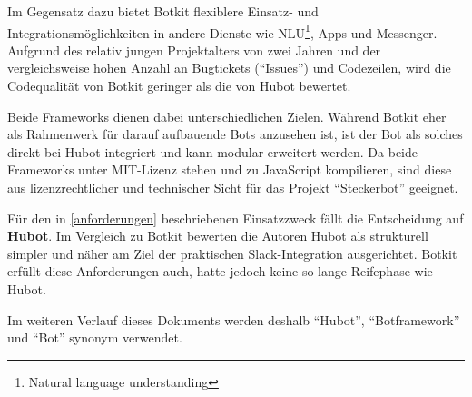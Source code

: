 Im Gegensatz dazu bietet Botkit flexiblere Einsatz- und Integrationsmöglichkeiten in andere Dienste wie NLU\footnote{Natural language understanding}, Apps und Messenger. Aufgrund des relativ jungen Projektalters von zwei Jahren und der vergleichsweise hohen Anzahl an Bugtickets (\enquote{Issues}) und Codezeilen, wird die Codequalität von Botkit geringer als die von Hubot bewertet.

Beide Frameworks dienen dabei unterschiedlichen Zielen. Während Botkit eher als Rahmenwerk für darauf aufbauende Bots anzusehen ist, ist der Bot als solches direkt bei Hubot integriert und kann modular erweitert werden. Da beide Frameworks unter MIT-Lizenz stehen und zu JavaScript kompilieren, sind diese aus lizenzrechtlicher und technischer Sicht für das Projekt \enquote{Steckerbot} geeignet.

Für den in \autoref{anforderungen} beschriebenen Einsatzzweck fällt die Entscheidung auf \textbf{Hubot}. Im Vergleich zu Botkit bewerten die Autoren Hubot als strukturell simpler und näher am Ziel der praktischen Slack-Integration ausgerichtet. Botkit erfüllt diese Anforderungen auch, hatte jedoch keine so lange Reifephase wie Hubot.

Im weiteren Verlauf dieses Dokuments werden deshalb \enquote{Hubot}, \enquote{Botframework} und \enquote{Bot} synonym verwendet.

